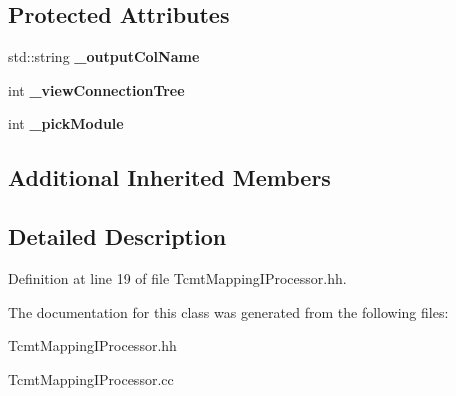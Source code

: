 \subsection*{Protected Attributes}
\begin{DoxyCompactItemize}
\item 
std\-::string {\bfseries \-\_\-output\-Col\-Name}\label{classCALICE_1_1TcmtMappingIProcessor_a15cfbc83930d9bbdbfdc06e236a7ef85}

\item 
int {\bfseries \-\_\-view\-Connection\-Tree}\label{classCALICE_1_1TcmtMappingIProcessor_ac01cd43e9ffa831e71f4b532f41e53ba}

\item 
int {\bfseries \-\_\-pick\-Module}\label{classCALICE_1_1TcmtMappingIProcessor_a410fc845042ea33a01a75014320c9022}

\end{DoxyCompactItemize}
\subsection*{Additional Inherited Members}


\subsection{Detailed Description}


Definition at line 19 of file Tcmt\-Mapping\-I\-Processor.\-hh.



The documentation for this class was generated from the following files\-:\begin{DoxyCompactItemize}
\item 
Tcmt\-Mapping\-I\-Processor.\-hh\item 
Tcmt\-Mapping\-I\-Processor.\-cc\end{DoxyCompactItemize}
